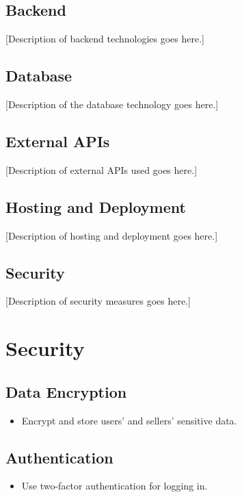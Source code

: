 \subsection{Backend}
[Description of backend technologies goes here.]

\subsection{Database}
[Description of the database technology goes here.]

\subsection{External APIs}
[Description of external APIs used goes here.]

\subsection{Hosting and Deployment}
[Description of hosting and deployment goes here.]

\subsection{Security}
[Description of security measures goes here.]

\section{Security}

\subsection{Data Encryption}
\begin{itemize}
  \item Encrypt and store users' and sellers' sensitive data.
\end{itemize}

\subsection{Authentication}
\begin{itemize}
  \item Use two-factor authentication for logging in.
\end{itemize}
